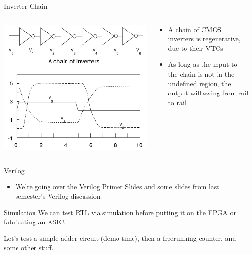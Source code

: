 \documentclass[12pt,aspectratio=169]{beamer}
\begin{document}
\begin{frame}{Inverter Chain}
  \begin{columns}
    \begin{column}{0.5\textwidth}
      \begin{center}
        \includegraphics[width=\textwidth]{regen2.png}
      \end{center}
    \end{column}
    \begin{column}{0.5\textwidth}
      \begin{itemize}
        \setlength\itemsep{0.75em}
        \item A chain of CMOS inverters is regenerative, due to their VTCs
        \item As long as the input to the chain is not in the undefined region, the output will swing from rail to rail
      \end{itemize}
    \end{column}
  \end{columns}
\end{frame}

\begin{frame}{Verilog}
  \begin{itemize}
    \item We're going over the \href{http://inst.eecs.berkeley.edu/~eecs151/fa19/files/verilog/Verilog_Primer_Slides.pdf}{Verilog Primer Slides} and some slides from last semester's Verilog discussion.
  \end{itemize}
\end{frame}

\begin{frame}{Simulation}
  We can test RTL via simulation before putting it on the FPGA or fabricating an ASIC.

  Let's test a simple adder circuit (demo time), then a freerunning counter, and some other stuff.
\end{frame}
\end{document}
